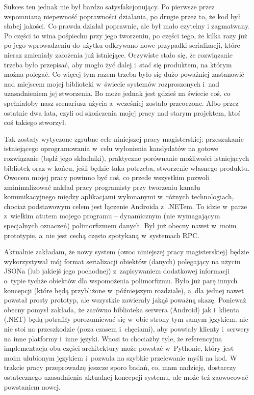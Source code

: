 Sukces ten jednak nie był bardzo satysfakcjonujący. Po pierwsze przez wspomnianą niepewność poprawności działania, po drugie przez to, że kod był słabej jakości. Co prawda działał poprawnie, ale był mało czytelny i zagmatwany. Po części to wina pośpiechu przy jego tworzeniu, po części tego, że kilka razy już po jego wprowadzeniu do użytku odkrywano nowe przypadki serializacji, które nieraz zmieniały założenia już istniejące. Oczywiste stało się, że rozwiązanie trzeba było przepisać, aby mogło żyć dalej i~stać się produktem, na którym można polegać. Co więcej tym razem trzeba było się dużo poważniej zastanowić nad miejscem mojej biblioteki w~świecie systemów rozproszonych i~nad uzasadnieniem jej stworzenia. Bo może jednak jest gdzieś na świecie coś, co spełniałoby nasz scenariusz użycia a~wcześniej zostało przeoczone. Albo przez ostatnie dwa lata, czyli od skończenia mojej pracy nad starym projektem, ktoś coś takiego stworzył.

Tak zostały wytyczone zgrubne cele niniejszej pracy magisterskiej: przeszukanie istniejącego oprogramowania w~celu wyłonienia kandydatów na gotowe rozwiązanie (bądź jego składniki), praktyczne porównanie możliwości istniejących bibliotek oraz w końcu, jeśli będzie taka potrzeba, stworzenie własnego produktu. Owocem mojej pracy powinno być coś, co przede wszystkim pozwoli zminimalizować nakład pracy programisty przy tworzeniu kanału komunikacyjnego między aplikacjami wykonanymi w~różnych technologiach, chociaż podstawowym celem jest łączenie Androida z~.NETem. To idzie w~parze z~wielkim atutem mojego programu -- dynamicznym (nie wymagającym specjalnych oznaczeń) polimorfizmem danych. Był już obecny nawet w~moim prototypie, a~nie jest cechą często spotykaną w~systemach RPC.

Aktualnie zakładam, że nowy system (owoc niniejszej pracy magisterskiej) będzie wykorzystywał mój format serializacji obiektów (danych) polegający na użyciu JSONa (lub jakiejś jego pochodnej) z~zapisywaniem dodatkowej informacji o~typie tychże obiektów dla wspomożenia polimorfizmu. Było już parę innych koncepcji (które będą przybliżone w~późniejszym rozdziale), a~dla jednej nawet powstał prosty prototyp, ale wszystkie zawierały jakąś poważną skazę. Ponieważ obecny pomysł zakłada, że zarówno biblioteka serwera (Android) jak i~klienta (.NET) będą potrafiły porozumiewać się w~obie strony tym samym językiem, nic nie stoi na przeszkodzie (poza czasem i~chęciami), aby powstały klienty i~serwery na inne platformy i~inne języki. Wnosi to chociażby tyle, że referencyjna implementacja obu części architektury może powstać w~Pythonie, który jest moim ulubionym językiem i~pozwala na szybkie przelewanie myśli na kod. W trakcie pracy przeprowadzę jeszcze sporo badań, co, mam nadzieję, dostarczy ostatecznego uzasadnienia aktualnej koncepcji systemu, ale może też zaowocować powstaniem nowej.

